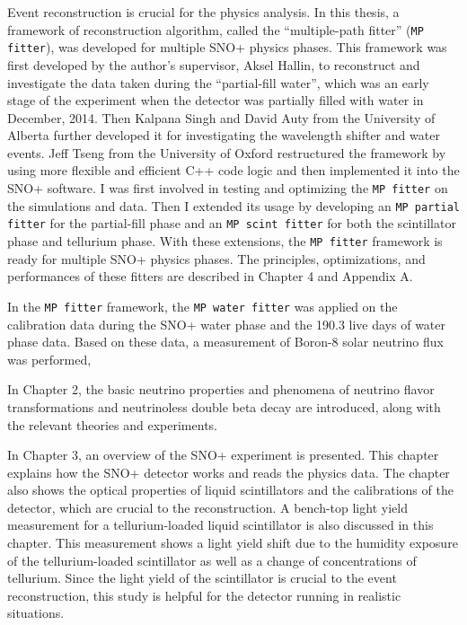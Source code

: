 Event reconstruction is crucial for the physics analysis. In this thesis, a framework of reconstruction algorithm, called the ``multiple-path fitter'' (\texttt{MP fitter}), was developed for multiple SNO+ physics phases. This framework was first developed by the author's supervisor, Aksel Hallin, to reconstruct and investigate the data taken during the ``partial-fill water'', which was an early stage of the experiment when the detector was partially filled with water in December, 2014\cite{partialWater}. Then Kalpana Singh and David Auty from the University of Alberta further developed it for investigating the wavelength shifter and water events\cite{davidPartialWater, kalpanaWLS, kalpanaWLS2, kalpanaMPFitter}. Jeff Tseng from the University of Oxford restructured the framework by using more flexible and efficient C++ code logic and then implemented it into the SNO+ software\cite{jieMPW}. I was first involved in testing and optimizing the \texttt{MP fitter} on the simulations and data. Then I extended its usage by developing an \texttt{MP partial fitter} for the partial-fill phase and an \texttt{MP scint fitter} for both the scintillator phase and tellurium phase. With these extensions, the \texttt{MP fitter} framework is ready for multiple SNO+ physics phases. The principles, optimizations, and performances of these fitters are described in Chapter 4 and Appendix A. 

In the \texttt{MP fitter} framework, the \texttt{MP water fitter} was applied on the calibration data during the SNO+ water phase and the 190.3 live days of water phase data. Based on these data, a measurement of Boron-8 solar neutrino flux was performed, 



In Chapter 2, the basic neutrino properties and phenomena of neutrino flavor transformations and neutrinoless double beta decay are introduced, along with the relevant theories and experiments.

In Chapter 3, an overview of the SNO+ experiment is presented. This chapter explains how the SNO+ detector works and reads the physics data. The chapter also shows the optical properties of liquid scintillators and the calibrations of the detector, which are crucial to the reconstruction. A bench-top light yield measurement for a tellurium-loaded liquid scintillator is also discussed in this chapter. This measurement shows a light yield shift due to the humidity exposure of the tellurium-loaded scintillator as well as a change of concentrations of tellurium. Since the light yield of the scintillator is crucial to the event reconstruction, this study is helpful for the detector running in realistic situations.

